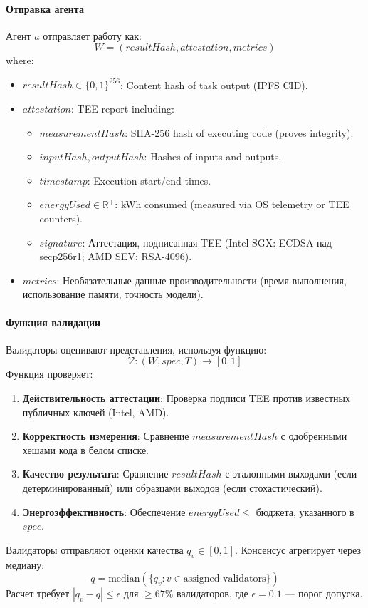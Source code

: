 \documentclass[11pt]{article}
\begin{document}
\paragraph{Отправка агента} Агент $a$ отправляет работу как:
\begin{equation}
W = (resultHash, attestation, metrics)
\end{equation}
where:
\begin{itemize}[noitemsep]
  \item $resultHash \in \{0,1\}^{256}$: Content hash of task output (IPFS CID).
  \item $attestation$: TEE report including:
    \begin{itemize}[noitemsep]
      \item $measurementHash$: SHA-256 hash of executing code (proves integrity).
      \item $inputHash, outputHash$: Hashes of inputs and outputs.
      \item $timestamp$: Execution start/end times.
      \item $energyUsed \in \mathbb{R}^+$: kWh consumed (measured via OS telemetry or TEE counters).
      \item $signature$: Аттестация, подписанная TEE (Intel SGX: ECDSA над secp256r1; AMD SEV: RSA-4096).
    \end{itemize}
  \item $metrics$: Необязательные данные производительности (время выполнения, использование памяти, точность модели).
\end{itemize}

\paragraph{Функция валидации} Валидаторы оценивают представления, используя функцию:
\begin{equation}
\mathcal{V}: (W, spec, T) \rightarrow [0, 1]
\end{equation}
Функция проверяет:
\begin{enumerate}[noitemsep]
  \item \textbf{Действительность аттестации}: Проверка подписи TEE против известных публичных ключей (Intel, AMD).
  \item \textbf{Корректность измерения}: Сравнение $measurementHash$ с одобренными хешами кода в белом списке.
  \item \textbf{Качество результата}: Сравнение $resultHash$ с эталонными выходами (если детерминированный) или образцами выходов (если стохастический).
  \item \textbf{Энергоэффективность}: Обеспечение $energyUsed \leq$ бюджета, указанного в $spec$.
\end{enumerate}
Валидаторы отправляют оценки качества $q_v \in [0,1]$. Консенсус агрегирует через медиану:
\begin{equation}
q = \text{median}(\{q_v : v \in \text{assigned validators}\})
\end{equation}
Расчет требует $|q_v - q| \leq \epsilon$ для $\geq 67\%$ валидаторов, где $\epsilon = 0.1$ — порог допуска.
\end{document}
